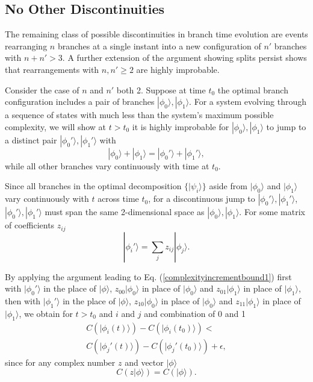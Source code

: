 \documentclass[twocolumn,amsmath,amssymb]{revtex4-1}
\begin{document}
\subsection{\label{subsec:norearrangments} No Other Discontinuities}

The remaining class of possible discontinuities
in branch time evolution 
are events
rearranging $n$ branches
at a single instant into a new configuration of $n'$ branches with $n + n' > 3$.
A further extension
of the argument showing splits persist
shows that rearrangements with $n, n' \ge 2$
are highly improbable.


Consider the case of $n$ and $n'$ both 2.
Suppose at time $t_0$ the optimal branch configuration includes
a pair of branches $|\phi_0 \rangle , |\phi_1 \rangle $.
For a system evolving through a sequence
of states with much less than the system's
maximum possible complexity,
we will show at $t > t_0$ it is highly improbable for
$|\phi_0 \rangle , |\phi_1 \rangle $
to jump to
a distinct pair $|\phi_0' \rangle , |\phi_1' \rangle $ with
\begin{equation}
  \label{merger2}
  |\phi_0 \rangle  + |\phi_1 \rangle  = |\phi_0' \rangle  + |\phi_1' \rangle ,
\end{equation}
while all other branches
vary continuously with time at $t_0$.

Since all branches in the optimal decomposition $\{ |\psi_i \rangle \}$
aside from $|\phi_0 \rangle $ and $|\phi_1 \rangle $
vary continuously with $t$ across time $t_0$,
for a discontinuous jump to $|\phi_0' \rangle , |\phi_1' \rangle $, 
$|\phi_0' \rangle , |\phi_1' \rangle $ must span the same
2-dimensional space as $|\phi_0 \rangle , |\phi_1 \rangle $.
For some matrix of coefficients $z_{ij}$
\begin{equation}
  \label{phirotation}
  |\phi_i' \rangle  = \sum_j z_{ij} |\phi_j \rangle .
\end{equation}

By applying the argument leading to Eq. (\ref{complexityincrementbound1})
first with $|\phi_0' \rangle $ in the place of $|\phi \rangle $,
$z_{00} |\phi_0 \rangle $ in place of $|\phi_0 \rangle $ and 
$z_{01} |\phi_1 \rangle $ in place of $|\phi_1 \rangle $,
then with $|\phi_1' \rangle $ in the place of $|\phi \rangle $,
$z_{10} |\phi_0 \rangle $ in place of $|\phi_0 \rangle $ and 
$z_{11} |\phi_1 \rangle $ in place of $|\phi_1 \rangle $,
we obtain for $t > t_0$ and $i$ and $j$
and combination of 0 and 1
\begin{multline}
  \label{complexityincrementbound2}
  C( |\phi_i(t) \rangle ) - C(|\phi_i(t_0) \rangle ) < \\
  C( |\phi_j'(t) \rangle ) - C(|\phi_j'(t_0) \rangle ) + \epsilon,
\end{multline}
since for any complex number $z$ and vector $|\phi \rangle $
\begin{equation}
  \label{scaleinv}
  C( z|\phi \rangle ) = C( |\phi \rangle ).
\end{equation}
\end{document}
